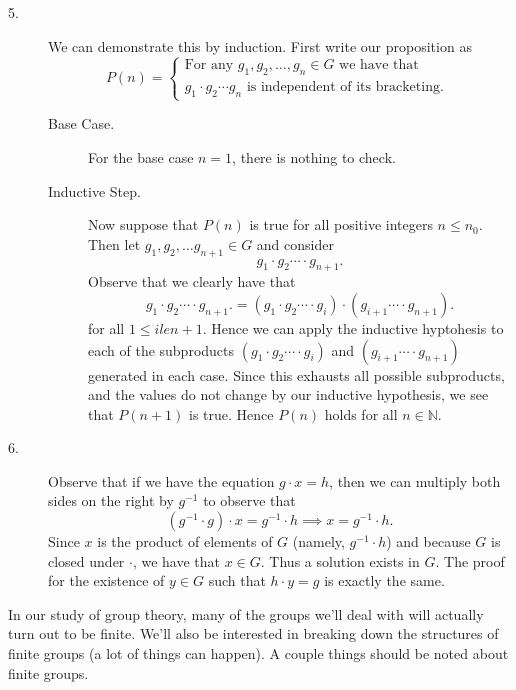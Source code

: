 \documentclass[12pt,letterpaper]{algebra_book}
\theoremstyle{definition}
\begin{document}
\begin{prf}
\begin{description}
        \item[5.] We can demonstrate this by induction. First write
        our proposition as
        \[
            P(n)
            =
            \begin{cases}
            \text{For any } g_1, g_2, \dots, g_n \in G\text{ we have that }\\
             g_1\cdot g_2 \cdots g_n \text{ is independent of its bracketing. }
            \end{cases}
        \] 
        \begin{description}
            \item[Base Case.]
            For the base case $n = 1$, there is nothing to check.
            \item[Inductive Step.]
            Now suppose that $P(n)$ is true for all positive integers
            $n \le n_0$. Then let $g_1, g_2, \dots g_{n+1}
            \in G$ and consider 
            \[
                g_1\cdot g_2 \cdots \cdot g_{n+1}.
            \]
            Observe that we clearly have that 
            \[
                g_1\cdot g_2 \cdots \cdot g_{n+1}. = (g_1\cdot g_2 \cdots \cdot g_{i})\cdot(g_{i+1} \cdots \cdot g_{n+1}).
            \]
            for all $1 \le i le n + 1$. Hence we can apply the
            inductive hyptohesis to each of the subproducts $(g_1\cdot
            g_2 \cdots \cdot g_{i})$ and $(g_{i+1} \cdots \cdot
            g_{n+1})$ generated
            in each case. Since this exhausts all possible
            subproducts, and the values do not change by our inductive
            hypothesis, we see that $P(n + 1)$ is true. Hence $P(n)$
            holds for all $n \in \mathbb{N}$. 
        \end{description}

        \item[6.] Observe that if we have the equation $g \cdot x =
        h$, then we can multiply both sides on the right by $g^{-1}$
        to observe that 
        \[
            (g^{-1} \cdot g) \cdot x = g^{-1} \cdot h \implies x = g^{-1} \cdot h.
        \]
        Since $x$ is the product of elements of $G$ (namely, $g^{-1}
        \cdot h$) and because $G$ is closed under $\cdot$, we have
        that $x \in G$. Thus a solution exists in $G$. The proof for
        the existence of $y \in G$ such that $h \cdot y = g$ is
        exactly the same.
    \end{description}
\end{prf}

In our study of group theory, many of the groups we'll deal with will
actually turn out to be finite. We'll also be interested in breaking
down the structures of finite groups (a lot of things can happen). 
A couple things should be noted about finite groups.
\end{document}
